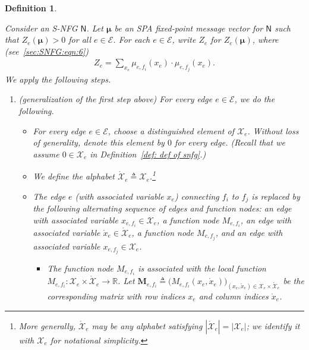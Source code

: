 \documentclass[journal]{IEEEtran}
\newcommand{\add}[1]{{\color{black}#1}}
\newtheorem{definition}[theorem]{Definition}
\newcommand{\vect}[1]{ \bm{#1} }
\newcommand{\set}[1]{\mathcal{#1}}
\newcommand{\setEfull}{ \mathcal{E} }
\newcommand{\sR}{\mathbb{R}}
\newcommand{\xe}{ x_{e} }
\newcommand{\setxe}{ \mathcal{X}_{e} }
\newcommand{\vmu}{ \vect{ \mu } }
\newcommand{\graphN}{ \mathsf{N} }
\newcommand{\setE}{ \mathcal{E} }
\newcommand{\defeq}{ \triangleq }
\newcommand{\matr}[1]{\vect{#1}}
\newcommand{\LCTset}[1]{\mathring{\mathcal{#1}}}
\newcommand{\LCT}[1]{ \mathring{#1} }
\newcommand{\efi}{ e,f_i }
\newcommand{\efj}{ e,f_j }
\newcommand{\LCTsetxe}{ \LCTset{X}_{e} }
\begin{document}
\begin{definition}
  \label{sec:LCT:def:1}

  Consider an S-NFG $\graphN$. Let
  $\vmu $ be an SPA
  fixed-point message vector for $\graphN$ such that $ Z_e(\vmu) >0 $ for all $ e \in \setEfull $. \add{For each $ e \in \setEfull $, write} $Z_e$ for $Z_e(\vmu)$, where
  (see~\eqref{sec:SNFG:eqn:6})
  \begin{align*}
    Z_e
    = \sum_{x_e} \mu_{\efi}(\xe) \cdot \mu_{\efj}(\xe).
  \end{align*}
  We apply the following steps.
  \begin{enumerate}

    \item (generalization of the first step above) For every edge $e \in
            \setEfull$, we do the following.

          \begin{itemize}

            \item \add{For every edge $e \in \setE$, choose a distinguished element of
                    $\set{X}_e$. Without loss of generality, denote this element by $0$ for every edge.}
                  (Recall that we assume $ 0 \in \setxe $ in Definition~\ref{def: def of snfg}.)

            \item We define the alphabet
                  $\LCTsetxe \defeq \set{X}_e$.\footnote{\add{More generally, $\LCTsetxe$ may be any alphabet satisfying $|\LCTsetxe|=|\set{X}_e|$; we identify it with $\set{X}_e$ for notational simplicity.}}

            \item The edge $e$ (with associated variable $x_e$) connecting $f_{i}$ to $f_{j}$
                  is replaced by the following alternating sequence of edges and function
                  nodes: an edge with associated variable $x_{e,f_{i}} \in \set{X}_e$, a
                  function node $M_{\efi}$, an edge with associated variable
                  $\LCT{x}_e \in \LCTsetxe$, a function node $M_{\efj}$, and an edge
                  with associated variable $x_{e,f_{j}} \in \set{X}_e$.
                  \begin{itemize}

                    \item The function node $M_{\efi}$ is associated with the local function
                          $M_{\efi}: \set{X}_e \times \LCTsetxe \to \sR$.
                          Let $ \matr{M}_{\efi} \defeq \bigl( M_{\efi}(\xe, \LCT{x}_e) \bigr)_{\!
                              (\xe, \LCT{x}_e) \in \set{X}_e \times \LCTsetxe} $ be the corresponding matrix
                          with row indices $ \xe $ and column indices $ \LCT{x}_e $.


\end{itemize}
\end{itemize}
\end{enumerate}
\end{definition}
\end{document}
